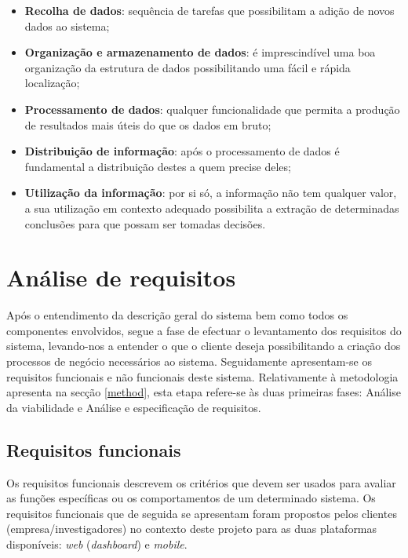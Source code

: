 \begin{itemize}
	\item \textbf{Recolha de dados}: sequência de tarefas que possibilitam a adição de novos dados ao sistema;
	
	\item \textbf{Organização e armazenamento de dados}: é imprescindível uma boa organização da estrutura de dados possibilitando uma fácil e rápida localização;
	
	\item \textbf{Processamento de dados}: qualquer funcionalidade que permita a produção de resultados mais úteis do que os dados em bruto; 
	
	\item \textbf{Distribuição de informação}: após o processamento de dados é fundamental a distribuição destes a quem precise deles; 
	
	\item \textbf{Utilização da informação}: por si só, a informação não tem qualquer valor, a sua utilização em contexto adequado possibilita a extração de determinadas conclusões para que possam ser tomadas decisões.
	
\end{itemize}





\section{Análise de requisitos}
\label{sect:analise}



Após o entendimento da descrição geral do sistema bem como todos os componentes envolvidos, segue a fase de efectuar o levantamento dos requisitos do sistema, levando-nos a entender o que o cliente deseja possibilitando a criação dos processos de negócio necessários ao sistema. Seguidamente apresentam-se os requisitos funcionais e não funcionais deste sistema. Relativamente à metodologia apresenta na secção \ref{method}, esta etapa refere-se às duas primeiras fases: Análise da viabilidade e Análise e especificação de requisitos. 


\subsection{Requisitos funcionais}


Os requisitos funcionais descrevem os critérios que devem ser usados para avaliar as funções específicas ou os comportamentos de um determinado sistema. Os requisitos funcionais que de seguida se apresentam foram propostos pelos clientes (empresa/investigadores) no contexto deste projeto para as duas plataformas disponíveis: \textit{web} (\textit{dashboard}) e \textit{mobile}. \\


